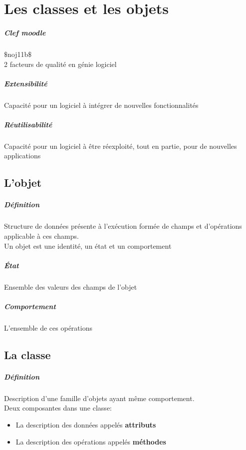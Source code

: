\chapter{Les classes et les objets}
\paragraph{Clef moodle} $\$$noj11b$\$$\\
2 facteurs de qualité en génie logiciel
	\paragraph{Extensibilité} Capacité pour un logiciel à intégrer de nouvelles fonctionnalités
	\paragraph{Réutilisabilité} Capacité pour un logiciel à être réexploité, tout en partie, 
		pour de nouvelles applications
\section{L'objet}
	\paragraph{Définition} Structure de données présente à l'exécution formée de champs et 
	d'opérations applicable à ces champs.\\
	Un objet est une identité, un état et un comportement

	\paragraph{État} Ensemble des valeurs des champs de l'objet
	\paragraph{Comportement} L'ensemble de ces opérations
\section{La classe}	
	\paragraph{Définition} Description d'une famille d'objets ayant même comportement. \\
	Deux composantes dans une classe:
	\begin{itemize}
		\item La description des données appelés \textbf{attributs}
		\item La description des opérations appelés \textbf{méthodes}
	\end{itemize}
	\newpage
